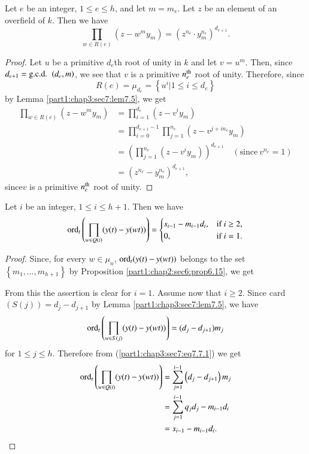 \begin{lemma}\label{part1:chap3:sec7:lem7.6}
  Let $e$ be an integer, $1 \leq e \leq h$, and let $m = m_e$. Let $z$ be an element of an overfield of $k$. Then we have
$$
\prod_{w \in R(e)} (z- w^m y_m) = (z^{n_e} \cdot y^{n_e}_m)^{d_{e+1}}.
$$
\end{lemma}

\begin{proof}
  Let $u$ be a primitive $d_e$th root of unity in $k$ and let $v= u^m$. Then, since $d_{e+1}= \text{\gcd}~ (d_e, m)$, we see that $v$ is a primitive $n_e^{\rm th}$ root of unity. Therefore, since
$$
R(e) = \mu_{d_e} = \left\{ u^i \Big| 1 \leq i \leq d_e \right\}
$$
by Lemma \ref{part1:chap3:sec7:lem7.5}, we get
\begin{align*}
  \prod_{w \in R(e)} (z- w^m y_m) & = \prod^{d_e}_{i=1} (z- v^i y_m)\\
  & = \prod^{d_{e+1}-1}_{i=0} \prod^{n_e}_{j=1} (z- v^{j+ in_e}y_m)\\
  & = \left( \prod^{n_e}_{j=1} (z- v^i y_m)\right)^{d_{e+1}} \quad (\text{since}~ v^{n_e}=1)\\
  & = \left(z^{n_e}- y^{n_e}_m \right)^{d_{e+1}},
\end{align*}
since\pageoriginale $v$ is a primitive $n_e^{\rm th}$ root of unity.
\end{proof}

\begin{lemma}\label{part1:chap3:sec7:lem7.7}
  Let $i$ be an integer, $1 \leq i \leq h+1$. Then we have 
$$
\ord_t \left( \prod_{w \in Q (i)} (y (t)- y(wt))\right) = \begin{cases} s_{i-1} - m_{i-1} d_i, & \text{if}~ i \geq 2,\\
  0, & \text{if}~ i=1.
\end{cases}
$$
\end{lemma}

\begin{proof}
  Since, for every $w \in \mu_n$, $\ord_t(y(t)- y(wt))$ belongs to the set $\left\{ m_1, \ldots , m_{h+1} \right\}$ by Proposition \ref{part1:chap2:sec6:prop6.15}, we get

From this the assertion is clear for $i=1$. Assume now that $i \geq 2$. Since card $(S(j))= d_j - d_{j+1}$ by Lemma \ref{part1:chap3:sec7:lem7.5}, we have
$$
\ord_t \left( \prod_{w \in S(j)} (y(t) - y(wt))\right)= (d_j - d_{j+1}) m_j
$$
for $1 \leq j \leq h$. Therefore from (\ref{part1:chap3:sec7:eq7.7.1}) we get
\begin{align*}
  \ord_t \left( \prod_{w \in Q (i)} (y(t)- y(wt))\right) & = \sum^{i-1}_{j=1} \left( d_j - d_{j+1}\right) m_j\\
  & = \sum_{j=1}^{i-1} q_j d_j - m_{i-1} d_i\\
  & = s_{i-1} - m_{i-1}d_i.
\end{align*}
\end{proof}

